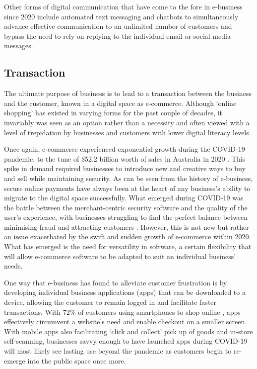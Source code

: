 \documentclass[12pt]{article}
\begin{document}
Other forms of digital communication that have come to the fore in e-business since 2020 include automated text messaging and chatbots to simultaneously advance effective communication to an unlimited number of customers and bypass the need to rely on replying to the individual email or social media messages.

\subsection{Transaction}
The ultimate purpose of business is to lead to a transaction between the business and the customer, known in a digital space as e-commerce. Although ‘online shopping’ has existed in varying forms for the past couple of decades, it invariably was seen as an option rather than a necessity and often viewed with a level of trepidation by businesses and customers with lower digital literacy levels. \par 

Once again, e-commerce experienced exponential growth during the COVID-19 pandemic, to the tune of \$52.2 billion worth of sales in Australia in 2020 \cite{knowles}. This spike in demand required businesses to introduce new and creative ways to buy and sell while maintaining security. As can be seen from the history of e-business, secure online payments have always been at the heart of any business’s ability to migrate to the digital space successfully. What emerged during COVID-19 was the battle between the merchant-centric security software and the quality of the user’s experience, with businesses struggling to find the perfect balance between minimising fraud and attracting customers \cite{kemp}. However, this is not new but rather an issue exacerbated by the swift and sudden growth of e-commerce within 2020. What has emerged is the need for versatility in software, a certain flexibility that will allow e-commerce software to be adapted to suit an individual business’ needs. \par 

One way that e-business has found to alleviate customer frustration is by developing individual business applications (apps) that can be downloaded to a device, allowing the customer to remain logged in and facilitate faster transactions.  With 72\% of customers using smartphones to shop online \cite{columbus}, apps effectively circumvent a website’s need and enable checkout on a smaller screen. With mobile apps also facilitating ‘click and collect’ pick up of goods and in-store self-scanning, businesses savvy enough to have launched apps during COVID-19 will most likely see lasting use beyond the pandemic as customers begin to re-emerge into the public space once more.
\end{document}

